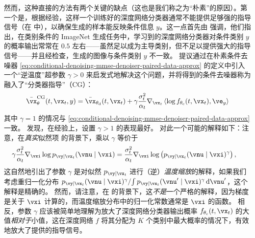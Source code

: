 \documentclass[../../book-main.tex]{subfiles}
\begin{document}
然而，这种直接的方法有两个关键的缺点（这也是我们称之为“朴素”的原因）。第一个是，根据经验，这样一个训练好的深度网络分类器通常不能提供足够强的指导信号（在  中），以确保生成的样本能反映条件信息 $y$。这一点首先由 \citet{Dhariwal2021-hg} 强调，他们指出，在类别条件的 ImageNet 生成任务中，学习到的深度网络分类器对条件类别 $y$ 的概率输出常常在 $0.5$ 左右——虽然足以成为主导类别，但不足以提供强大的指导信号——并且经检查，生成的图像与条件类别 $y$ 不一致。\citet{Dhariwal2021-hg} 提议通过在朴素条件去噪器 \eqref{eq:conditional-denoising-mmse-denoiser-paired-data-approx} 的定义中引入一个“逆温度”超参数 $\gamma > 0$ 来启发式地解决这个问题，并将得到的条件去噪器称为融入了“分类器指导”（CG）：
\begin{equation}\label{eq:conditional-denoising-mmse-denoiser-paired-data-approx-cg}
  \bar{\vx}_{\theta}^{\mathrm{CG}}(t, \vx_t, y)
  =
  \bar{\vx}_{\theta_{\mathrm{d}}}(t, \vx_t)
  + \gamma\frac{\sigma_t^2}{\alpha_t}
  \nabla_{\vx_t}
  \ip*{
    \log f_{\theta_{\mathrm{c}}}(t, \vx_t)
  }{
    \ve_{y}
  }
\end{equation}
其中 $\gamma = 1$ 的情况与 \eqref{eq:conditional-denoising-mmse-denoiser-paired-data-approx} 一致。
\citet{Dhariwal2021-hg} 发现，在经验上，设置 $\gamma > 1$ 的表现最好。
对此一个可能的解释如下：注意，在\textit{真实}似然项  的背景下，乘以 $\gamma$ 等价于
\begin{align}
  \gamma\frac{\sigma_t^2}{\alpha_t} \nabla_{\vxi}\log p_{\vy \mid \vx_t}(\vnu\mid
  \vxi)
  &=
  \frac{\sigma_t^2}{\alpha_t} \nabla_{\vxi}\log \left(
  p_{\vy \mid \vx_t}(\vnu\mid \vxi)^\gamma
  \right), %
\end{align}
这自然地引出了参数 $\gamma$ 是对似然 $p_{\vy \mid \vx_t}$ 进行（逆）\textit{温度缩放}的解释，如果我们考虑重归一化分布 $ { p_{\vy \mid \vx_t}(\vnu\mid \vxi)^\gamma } / { \int p_{\vy \mid \vx_t}(\vnu'\mid \vxi)^\gamma \odif \vnu' } $，这个解释是精确的。
然而，请注意，在  的背景下，这\textit{不是}一个严格的解释，因为梯度是关于 $\vxi$ 计算的，而温度缩放分布中的归一化常数通常是 $\vxi$ 的函数。
相反，参数 $\gamma$ 应该被简单地理解为放大了深度网络分类器输出概率 $f_{\theta_{\mathrm{c}}}(t, \vx_t)$ 的大值\textit{相对于}小值，这在深度网络 $f$ 将其分配为 $K$ 个类别中最大概率的情况下，有效地放大了提供的指导信号。
\end{document}
